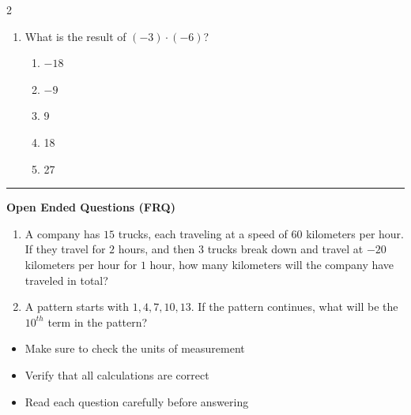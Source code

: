 \documentclass[10pt]{article}
\begin{document}
\begin{multicols}{2}
\begin{enumerate}[label=\textbf{Q\arabic*.}, leftmargin=*, itemsep=6pt, parsep=0pt]
  \item \small What is the result of $(-3) \cdot (-6)$?
  \begin{enumerate}[label=(\Alph*), leftmargin=0.6cm, nosep, itemsep=2pt]
    \item $-18$
    \item $-9$
    \item 9
    \item 18
    \item 27
  \end{enumerate}

\end{enumerate}
\end{multicols}

\vspace{-0.2cm}
\hrule
\vspace{0.2cm}
\textbf{\small Open Ended Questions (FRQ)}
\begin{enumerate}[label=\textbf{Q\arabic*.}, start=9, itemsep=5pt, topsep=0pt]

  \item \small A company has $15$ trucks, each traveling at a speed of $60$ kilometers per hour. If they travel for $2$ hours, and then $3$ trucks break down and travel at $-20$ kilometers per hour for $1$ hour, how many kilometers will the company have traveled in total? \vspace{2cm}

  \item \small A pattern starts with $1, 4, 7, 10, 13$. If the pattern continues, what will be the $10^{th}$ term in the pattern? \vspace{2cm}

\end{enumerate}

\vfill

\begin{tcolorbox}[colback=blue!5, colframe=mainblue!50, title=\small \textbf{Chef's Tips}, fonttitle=\bfseries, bottom=1mm]
\begin{itemize}[noitemsep, topsep=2pt, leftmargin=0.5cm]
  \item \scriptsize Make sure to check the units of measurement\item \scriptsize Verify that all calculations are correct\item \scriptsize Read each question carefully before answering
\end{itemize}
\end{tcolorbox}
\end{document}
